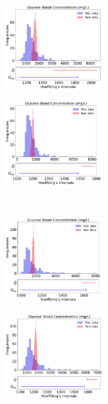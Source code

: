 \begin{figure}[t]
    \centering
        \begin{subfigure}[b]{0.26\textwidth}
    \includegraphics[height=3.7cm]{figures/causal/latest_experimental_results/Glucose_hyp_1_with_hoeff_onesided_loFalse_nogray.pdf}
    \label{fig:glucosea-supp}
    \end{subfigure}\hspace{1cm}%
    \begin{subfigure}[b]{0.26\textwidth}
    \includegraphics[height=3.7cm]{figures/causal/latest_experimental_results/Glucose_hyp_5_with_hoeff_onesided_loFalse_nogray.pdf}
    \label{fig:glucoseb-supp}
    \end{subfigure}\\      
    \begin{subfigure}[b]{0.26\textwidth}
    \includegraphics[height=3.7cm]{figures/causal/latest_experimental_results/Glucose_hyp_8_with_hoeff_onesided_loFalse_nogray.pdf}
    \label{fig:chloridea}
    \end{subfigure}\hspace{1cm}%
    \begin{subfigure}[b]{0.26\textwidth}
    \includegraphics[height=3.7cm]{figures/causal/latest_experimental_results/Glucose_hyp_6_with_hoeff_onesided_loFalse_nogray.pdf}

\end{subfigure}
\end{figure}
